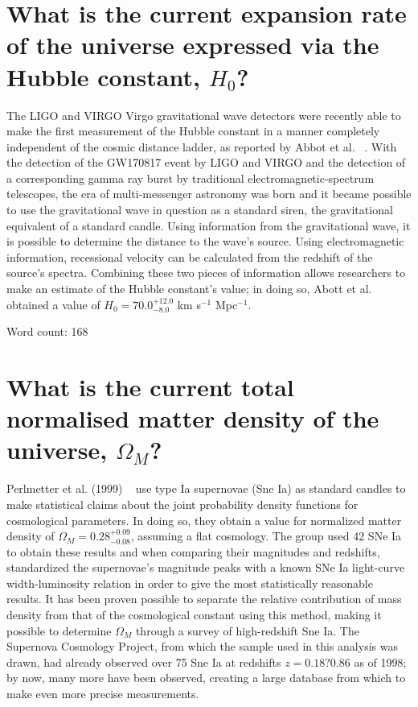 \documentclass{article}
\begin{document}
\section{What is the current expansion rate of the universe expressed via the Hubble constant, $H_0$?}

The LIGO and VIRGO Virgo gravitational wave detectors were recently able to make the first measurement of the Hubble constant in a manner completely independent of the cosmic distance ladder, as reported by Abbot et al. ~\cite{2017Natur.551...85A}. With the detection of the GW170817 event by LIGO and VIRGO and the detection of a corresponding gamma ray burst by traditional electromagnetic-spectrum telescopes, the era of multi-messenger astronomy was born and it became possible to use the gravitational wave in question as a standard siren, the gravitational equivalent of a standard candle. Using information from the gravitational wave, it is possible to determine the distance to the wave's source. Using electromagnetic information, recessional velocity can be calculated from the redshift of the source's spectra. Combining these two pieces of information allows researchers to make an estimate of the Hubble constant's value; in doing so, Abott et al. ~\cite{2017Natur.551...85A} obtained a value of $H_0 = 70.0^{+12.0}_{-8.0}$ km s$^{-1}$ Mpc$^{-1}$.

Word count: 168
 
\section{What is the current total normalised matter density of the universe, $\Omega_M$?}
Perlmetter et al. (1999) ~\cite{1999ApJ...517..565P} use type Ia supernovae (Sne Ia) as standard candles to make statistical claims about the joint probability density functions for cosmological parameters. In doing so, they obtain a value for normalized matter density of $\Omega_M = 0.28^{+0.09}_{-0.08}$, assuming a flat cosmology. The group used 42 SNe Ia to obtain these results and when comparing their magnitudes and redshifts, standardized the supernovae's magnitude peaks with a known SNe Ia light-curve width-luminosity relation in order to give the most statistically reasonable results. It has been proven possible to separate the relative contribution of mass density from that of the cosmological constant using this method, making it possible to determine $\Omega_M$ through a survey of high-redshift Sne Ia. The Supernova Cosmology Project, from which the sample used in this analysis was drawn, had already observed over 75 Sne Ia at redshifts $z = 0.18?0.86$ as of 1998; by now, many more have been observed, creating a large database from which to make even more precise measurements.
\end{document}
